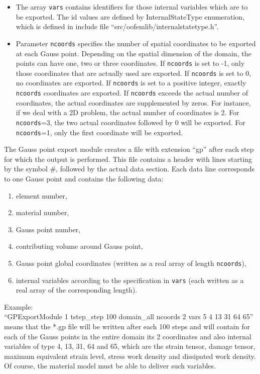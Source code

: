 \documentclass[a4paper]{report}
\newcommand{\param}[1]{\texttt{#1}} %
\begin{document}
\begin{itemize}
\begin{itemize}
\item The array \param{vars} contains identifiers for those internal
variables which are to be exported. The id values are defined by
InternalStateType enumeration, which is defined in include file
``src/oofemlib/internal\-statetype.h''.
\item Parameter \param{ncoords} specifies the number of spatial coordinates to be exported at each Gauss point. Depending on the spatial dimension of the
domain, the points can have one, two or three coordinates. If  \param{ncoords}
is set to -1, only those coordinates that are actually used are exported.
 If  \param{ncoords} is set to 0, no coordinates are exported.
If  \param{ncoords}
is set to a positive integer, exactly \param{ncoords} coordinates are exported.
If  \param{ncoords} exceeds the actual number of coordinates, the actual
coordinates are supplemented by zeros. For instance, if we deal with a 2D
problem, the actual number of coordinates is 2. For  \param{ncoords}=3,
the two actual coordinates followed by 0 will be exported.
For  \param{ncoords}=1, only the first coordinate will be exported.
\end{itemize}
The Gauss point export module creates a file with extension ``gp''
after each step for which the output is performed. This file contains
a header with lines starting by the symbol \#, followed by the actual data
section.
Each data line corresponds to one Gauss point and contains the following
data:
\begin{enumerate}
\item element number,
 \item    material number,
 \item     Gauss point number,
  \item   contributing volume around Gauss point,
\item Gauss point global coordinates (written as a real array of length \param{ncoords}),
\item internal variables according to the specification in \param{vars} (each written as a real array of the corresponding length).
\end{enumerate}
Example:\\
``GPExportModule 1 tstep\_step 100 domain\_all ncoords 2 vars 5 4 13 31 64 65''
\\
means that the *.gp file will be written after each 100 steps and will contain
for each of the Gauss points in the entire domain its 2 coordinates and also internal
variables of type 4, 13, 31, 64 and 65, which are the strain tensor, damage tensor, maximum equivalent strain level, stress work density and dissipated work density. Of course, the material model must be able to deliver such variables. 

\end{itemize}
\end{document}
